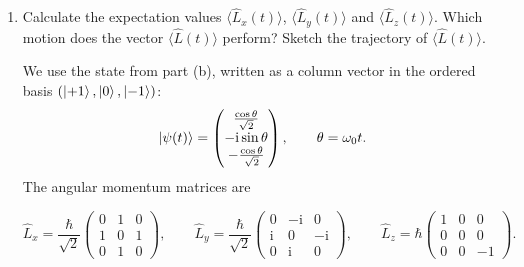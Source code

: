 \documentclass[11pt,a4paper]{scrartcl}
\newcommand{\ii}{\mathrm{i}}
\newcommand{\op}[1]{\hat{#1}}
\begin{document}
\begin{enumerate}[label=(\alph*)]
        \begin{answerbox}
            \[
                \boxed{\ket{\psi(t)}=\frac{\cos(\omega_0t)}{\sqrt{2}}\left(\ket{+1}-\ket{-1}\right)-\ii\sin(\omega_0t)\ket{0}}
            \]
            and
            \[
                \boxed{
                P(\hbar)=\frac12\cos^2(\omega_0t),\qquad
                P(0)=\sin^2(\omega_0t),\qquad
                P(-\hbar)=\frac12\cos^2(\omega_0t).}
            \]
        \end{answerbox}

        \item Calculate the expectation values $\langle\op{L}_x(t)\rangle$, $\langle\op{L}_y(t)\rangle$ and $\langle\op{L}_z(t)\rangle$. Which motion does the vector $\langle\op{L}(t)\rangle$ perform? Sketch the trajectory of $\langle\op{L}(t)\rangle$.

        \begin{calculationbox}
            We use the state from part (b), written as a column vector in the ordered basis $(\ket{+1},\ket{0},\ket{-1})$:
            \[
                \ket{\psi(t)}=
                \begin{pmatrix}
                    \frac{\cos\theta}{\sqrt{2}}\\
                    -\ii\sin\theta\\
                    -\frac{\cos\theta}{\sqrt{2}}
                \end{pmatrix},
                \qquad
                \theta=\omega_0t.
            \]
            The angular momentum matrices are
            \begin{calculationbox}
                \[
                    \op{L}_x=\frac{\hbar}{\sqrt{2}}
                    \begin{pmatrix}
                        0&1&0\\
                        1&0&1\\
                        0&1&0
                    \end{pmatrix},
                    \qquad
                    \op{L}_y=\frac{\hbar}{\sqrt{2}}
                    \begin{pmatrix}
                        0&-\ii&0\\
                        \ii&0&-\ii\\
                        0&\ii&0
                    \end{pmatrix},
                    \qquad
                    \op{L}_z=\hbar
                    \begin{pmatrix}
                        1&0&0\\
                        0&0&0\\
                        0&0&-1
                    \end{pmatrix}.
                \]
            \end{calculationbox}


\end{calculationbox}
\end{enumerate}
\end{document}
